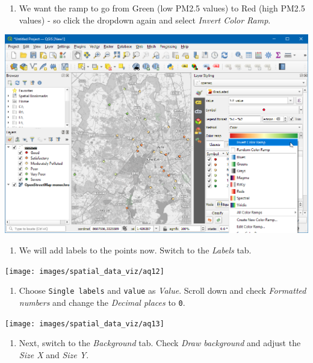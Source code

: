 \documentclass[
  12pt,
  a4paper]{article}
\providecommand{\tightlist}{%
  \setlength{\itemsep}{0pt}\setlength{\parskip}{0pt}}
\begin{document}
\begin{enumerate}
\def\labelenumi{\arabic{enumi}.}
\setcounter{enumi}{10}
\tightlist
\item
  We want the ramp to go from Green (low PM2.5 values) to Red (high
  PM2.5 values) - so click the dropdown again and select \emph{Invert
  Color Ramp}.
\end{enumerate}

\begin{center}\includegraphics[width=0.75\linewidth]{images/spatial_data_viz/aq11} \end{center}

\begin{enumerate}
\def\labelenumi{\arabic{enumi}.}
\setcounter{enumi}{11}
\tightlist
\item
  We will add labels to the points now. Switch to the \emph{Labels} tab.
\end{enumerate}

\begin{center}\texttt{[image: images/spatial\_data\_viz/aq12]} \end{center}

\begin{enumerate}
\def\labelenumi{\arabic{enumi}.}
\setcounter{enumi}{12}
\tightlist
\item
  Choose \texttt{Single\ labels} and \texttt{value} as \emph{Value}.
  Scroll down and check \emph{Formatted numbers} and change the
  \emph{Decimal places} to \texttt{0}.
\end{enumerate}

\begin{center}\texttt{[image: images/spatial\_data\_viz/aq13]} \end{center}

\begin{enumerate}
\def\labelenumi{\arabic{enumi}.}
\setcounter{enumi}{13}
\tightlist
\item
  Next, switch to the \emph{Background} tab. Check \emph{Draw
  background} and adjust the \emph{Size X} and \emph{Size Y}.
\end{enumerate}
\end{document}
